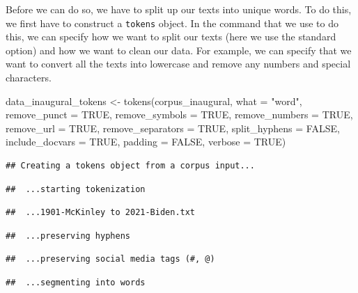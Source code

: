\documentclass[
]{article}
\newenvironment{Shaded}{\begin{snugshade}}{\end{snugshade}}
\newcommand{\AttributeTok}[1]{\textcolor[rgb]{0.77,0.63,0.00}{#1}}
\newcommand{\ConstantTok}[1]{\textcolor[rgb]{0.00,0.00,0.00}{#1}}
\newcommand{\FunctionTok}[1]{\textcolor[rgb]{0.00,0.00,0.00}{#1}}
\newcommand{\NormalTok}[1]{#1}
\newcommand{\OtherTok}[1]{\textcolor[rgb]{0.56,0.35,0.01}{#1}}
\newcommand{\StringTok}[1]{\textcolor[rgb]{0.31,0.60,0.02}{#1}}
\begin{document}
Before we can do so, we have to split up our texts into unique words. To do this, we first have to construct a \texttt{tokens} object. In the command that we use to do this, we can specify how we want to split our texts (here we use the standard option) and how we want to clean our data. For example, we can specify that we want to convert all the texts into lowercase and remove any numbers and special characters.

\begin{Shaded}
\begin{Highlighting}[]
\NormalTok{data\_inaugural\_tokens }\OtherTok{\textless{}{-}} \FunctionTok{tokens}\NormalTok{(corpus\_inaugural, }\AttributeTok{what =} \StringTok{"word"}\NormalTok{,}
    \AttributeTok{remove\_punct =} \ConstantTok{TRUE}\NormalTok{, }\AttributeTok{remove\_symbols =} \ConstantTok{TRUE}\NormalTok{, }\AttributeTok{remove\_numbers =} \ConstantTok{TRUE}\NormalTok{,}
    \AttributeTok{remove\_url =} \ConstantTok{TRUE}\NormalTok{, }\AttributeTok{remove\_separators =} \ConstantTok{TRUE}\NormalTok{, }\AttributeTok{split\_hyphens =} \ConstantTok{FALSE}\NormalTok{,}
    \AttributeTok{include\_docvars =} \ConstantTok{TRUE}\NormalTok{, }\AttributeTok{padding =} \ConstantTok{FALSE}\NormalTok{, }\AttributeTok{verbose =} \ConstantTok{TRUE}\NormalTok{)}
\end{Highlighting}
\end{Shaded}

\begin{verbatim}
## Creating a tokens object from a corpus input...
\end{verbatim}

\begin{verbatim}
##  ...starting tokenization
\end{verbatim}

\begin{verbatim}
##  ...1901-McKinley to 2021-Biden.txt
\end{verbatim}

\begin{verbatim}
##  ...preserving hyphens
\end{verbatim}

\begin{verbatim}
##  ...preserving social media tags (#, @)
\end{verbatim}

\begin{verbatim}
##  ...segmenting into words
\end{verbatim}
\end{document}
